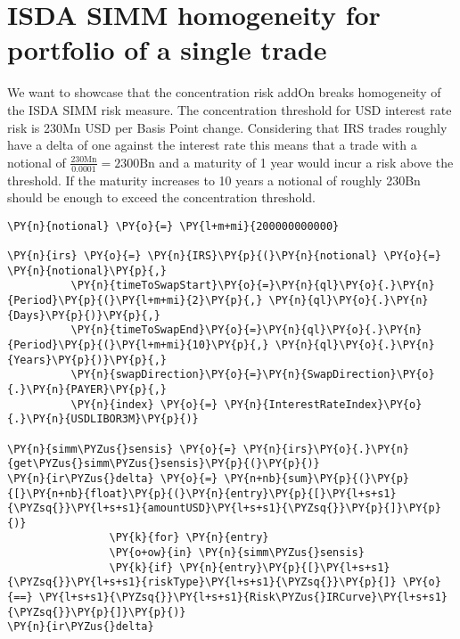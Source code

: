     

    
    \hypertarget{isda-simm-homogeneity-for-portfolio-of-a-single-trade}{%
\section{ISDA SIMM homogeneity for portfolio of a single
trade}\label{isda-simm-homogeneity-for-portfolio-of-a-single-trade}}

    We want to showcase that the concentration risk addOn breaks homogeneity
of the ISDA SIMM risk measure. The concentration threshold for USD
interest rate risk is 230Mn USD per Basis Point change. Considering that
IRS trades roughly have a delta of one against the interest rate this
means that a trade with a notional of
\(\frac{230\text{Mn}}{0.0001} = 2300\text{Bn}\) and a maturity of 1 year
would incur a risk above the threshold. If the maturity increases to 10
years a notional of roughly 230Bn should be enough to exceed the
concentration threshold.

    \begin{tcolorbox}[breakable, size=fbox, boxrule=1pt, pad at break*=1mm,colback=cellbackground, colframe=cellborder]
\begin{Verbatim}[commandchars=\\\{\}]
\PY{n}{notional} \PY{o}{=} \PY{l+m+mi}{200000000000}

\PY{n}{irs} \PY{o}{=} \PY{n}{IRS}\PY{p}{(}\PY{n}{notional} \PY{o}{=} \PY{n}{notional}\PY{p}{,}
          \PY{n}{timeToSwapStart}\PY{o}{=}\PY{n}{ql}\PY{o}{.}\PY{n}{Period}\PY{p}{(}\PY{l+m+mi}{2}\PY{p}{,} \PY{n}{ql}\PY{o}{.}\PY{n}{Days}\PY{p}{)}\PY{p}{,}
          \PY{n}{timeToSwapEnd}\PY{o}{=}\PY{n}{ql}\PY{o}{.}\PY{n}{Period}\PY{p}{(}\PY{l+m+mi}{10}\PY{p}{,} \PY{n}{ql}\PY{o}{.}\PY{n}{Years}\PY{p}{)}\PY{p}{,}
          \PY{n}{swapDirection}\PY{o}{=}\PY{n}{SwapDirection}\PY{o}{.}\PY{n}{PAYER}\PY{p}{,}
          \PY{n}{index} \PY{o}{=} \PY{n}{InterestRateIndex}\PY{o}{.}\PY{n}{USDLIBOR3M}\PY{p}{)}

\PY{n}{simm\PYZus{}sensis} \PY{o}{=} \PY{n}{irs}\PY{o}{.}\PY{n}{get\PYZus{}simm\PYZus{}sensis}\PY{p}{(}\PY{p}{)}
\PY{n}{ir\PYZus{}delta} \PY{o}{=} \PY{n+nb}{sum}\PY{p}{(}\PY{p}{[}\PY{n+nb}{float}\PY{p}{(}\PY{n}{entry}\PY{p}{[}\PY{l+s+s1}{\PYZsq{}}\PY{l+s+s1}{amountUSD}\PY{l+s+s1}{\PYZsq{}}\PY{p}{]}\PY{p}{)}
                \PY{k}{for} \PY{n}{entry}
                \PY{o+ow}{in} \PY{n}{simm\PYZus{}sensis}
                \PY{k}{if} \PY{n}{entry}\PY{p}{[}\PY{l+s+s1}{\PYZsq{}}\PY{l+s+s1}{riskType}\PY{l+s+s1}{\PYZsq{}}\PY{p}{]} \PY{o}{==} \PY{l+s+s1}{\PYZsq{}}\PY{l+s+s1}{Risk\PYZus{}IRCurve}\PY{l+s+s1}{\PYZsq{}}\PY{p}{]}\PY{p}{)}
\PY{n}{ir\PYZus{}delta}
\end{Verbatim}
\end{tcolorbox}


